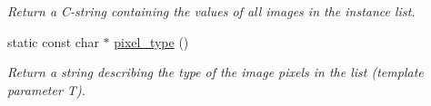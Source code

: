 \begin{DoxyCompactItemize}
\begin{DoxyCompactList}\small\item\em Return a C-\/string containing the values of all images in the instance list. \item\end{DoxyCompactList}\item 
\hypertarget{structcimg__library_1_1CImgList_ab7d3a61366cf906c03af6c8fa13309a7}{
static const char $\ast$ \hyperlink{structcimg__library_1_1CImgList_ab7d3a61366cf906c03af6c8fa13309a7}{pixel\_\-type} ()}
\label{structcimg__library_1_1CImgList_ab7d3a61366cf906c03af6c8fa13309a7}

\begin{DoxyCompactList}\small\item\em Return a string describing the type of the image pixels in the list (template parameter {\ttfamily T}). \item\end{DoxyCompactList}\end{DoxyCompactItemize}

